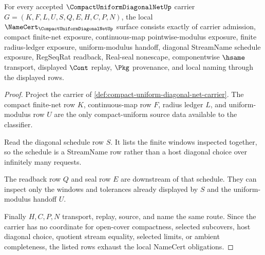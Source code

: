 \begin{theorem}
\label{thm:compact-uniform-diagonal-net-namecert-obligations}
For every accepted $\CompactUniformDiagonalNetUp$ carrier $G=(K,F,L,U,S,Q,E,H,C,P,N)$, the local $\NameCert_{\CompactUniformDiagonalNetUp}$ surface consists exactly of carrier admission, compact finite-net exposure, continuous-map pointwise-modulus exposure, finite radius-ledger exposure, uniform-modulus handoff, diagonal StreamName schedule exposure, RegSeqRat readback, Real-seal nonescape, componentwise $\hsame$ transport, displayed $\Cont$ replay, $\Pkg$ provenance, and local naming through the displayed rows.
\end{theorem}
\begin{proof}
Project the carrier of \autoref{def:compact-uniform-diagonal-net-carrier}. The compact finite-net row $K$, continuous-map row $F$, radius ledger $L$, and uniform-modulus row $U$ are the only compact-uniform source data available to the classifier.

Read the diagonal schedule row $S$. It lists the finite windows inspected together, so the schedule is a StreamName row rather than a host diagonal choice over infinitely many requests.

The readback row $Q$ and seal row $E$ are downstream of that schedule. They can inspect only the windows and tolerances already displayed by $S$ and the uniform-modulus handoff $U$.

Finally $H,C,P,N$ transport, replay, source, and name the same route. Since the carrier has no coordinate for open-cover compactness, selected subcovers, host diagonal choice, quotient stream equality, selected limits, or ambient completeness, the listed rows exhaust the local NameCert obligations.
\end{proof}

